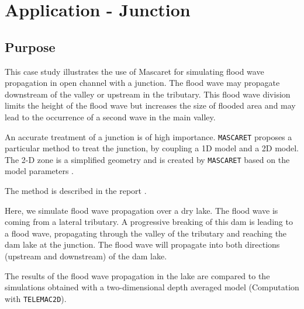 \documentclass[a4paper,12pt]{article}
\begin{document}
\newpage



 
\section{Application - \label{chap:Junction}Junction }


\subsection{Purpose}

\hspace{0.5cm} This case study illustrates the use of Mascaret for simulating flood wave propagation in open channel with a junction.  
The flood wave may propagate downstream of the valley or upstream in the tributary. This flood wave division limits the height of the flood wave but increases the size
of flooded area and may lead to the occurrence of a second wave in the main valley.

\vspace{0.5cm}

An accurate treatment of a junction is of high importance. \texttt{MASCARET}
proposes a particular method to treat the junction, by coupling
a 1D model and a 2D model. The 2-D zone is a simplified geometry and is created by \texttt{MASCARET} based
on the model parameters \cite{MAUREL96}.

\vspace{0.5cm}

The method is described in the report \cite{MAUREL96}.


\vspace{0.5cm}

Here, we simulate flood wave propagation over a dry lake. The flood wave is coming from a lateral tributary. A progressive breaking of this dam is leading
to a flood wave, propagating through the valley of the tributary and
reaching the dam lake at the junction. The flood wave will propagate
into both directions (upstream and downstream) of the dam lake.

\vspace{0.5cm}

The results of the flood wave propagation in the lake are compared to the simulations obtained with a two-dimensional depth averaged model (Computation with \texttt{TELEMAC2D}).
\end{document}
